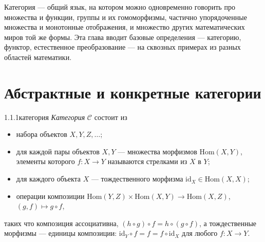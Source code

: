 Категория — общий язык, на котором можно одновременно говорить про множества и функции,
группы и их гомоморфизмы, частично упорядоченные множества и монотонные отображения,
и множество других математических миров той же формы. Эта глава вводит базовые
определения — категорию, функтор, естественное преобразование — на сквозных примерах
из разных областей математики.

\section{Абстрактные и конкретные категории}

\begin{definition}{1.1.1}{категория}
\emph{Категория} $\mathcal{C}$ состоит из
\begin{itemize}
  \item набора объектов $X, Y, Z, \ldots$;
  \item для каждой пары объектов $X, Y$ — множества морфизмов $\mathrm{Hom}(X,Y)$,
        элементы которого $f \colon X \to Y$ называются стрелками из $X$ в $Y$;
  \item для каждого объекта $X$ — тождественного морфизма $\mathrm{id}_X \in
        \mathrm{Hom}(X,X)$;
  \item операции композиции $\mathrm{Hom}(Y,Z) \times \mathrm{Hom}(X,Y) \to
        \mathrm{Hom}(X,Z)$, $(g,f) \mapsto g \circ f$,
\end{itemize}
таких что композиция ассоциативна, $(h \circ g) \circ f = h \circ (g \circ f)$, а
тождественные морфизмы — единицы композиции: $\mathrm{id}_Y \circ f = f = f \circ
\mathrm{id}_X$ для любого $f \colon X \to Y$.
\end{definition}

